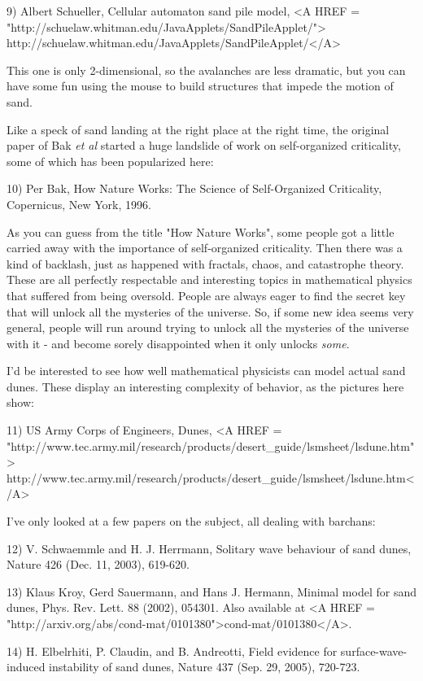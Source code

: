 9) Albert Schueller, Cellular automaton sand pile model,
<A HREF = "http://schuelaw.whitman.edu/JavaApplets/SandPileApplet/">
http://schuelaw.whitman.edu/JavaApplets/SandPileApplet/</A>

This one is only 2-dimensional, so the avalanches are less dramatic,
but you can have some fun using the mouse to build structures that 
impede the motion of sand.

Like a speck of sand landing at the right place at the right time, 
the original paper of Bak \emph{et al} started a huge landslide of work on 
self-organized criticality, some of which has been popularized here:

10) Per Bak, How Nature Works: The Science of Self-Organized Criticality,
Copernicus, New York, 1996.

As you can guess from the title "How Nature Works", some people got a 
little carried away with the importance of self-organized criticality.
Then there was a kind of backlash, just as happened with fractals, 
chaos, and catastrophe theory.  These are all perfectly respectable and 
interesting topics in mathematical physics that suffered from being 
oversold.  People are always eager to find the secret key that will 
unlock all the mysteries of the universe.  So, if some new idea seems 
very general, people will run around trying to unlock all the mysteries 
of the universe with it - and become sorely disappointed when it only 
unlocks \emph{some}.

I'd be interested to see how well mathematical physicists can model
actual sand dunes.  These display an interesting complexity of behavior,
as the pictures here show:

11) US Army Corps of Engineers, Dunes, 
<A HREF = "http://www.tec.army.mil/research/products/desert_guide/lsmsheet/lsdune.htm">
http://www.tec.army.mil/research/products/desert_guide/lsmsheet/lsdune.htm</A>

I've only looked at a few papers on the subject, all dealing with
barchans:

12) V. Schwaemmle and H. J. Herrmann, Solitary wave behaviour of sand 
dunes, Nature 426 (Dec. 11, 2003), 619-620.

13) Klaus Kroy, Gerd Sauermann, and Hans J. Hermann, Minimal model for
sand dunes, Phys. Rev. Lett. 88 (2002), 054301.  Also available at
<A HREF = "http://arxiv.org/abs/cond-mat/0101380">cond-mat/0101380</A>.

14) H. Elbelrhiti, P. Claudin, and B. Andreotti, Field evidence for 
surface-wave-induced instability of sand dunes, Nature 437 (Sep. 29, 2005),
720-723.

